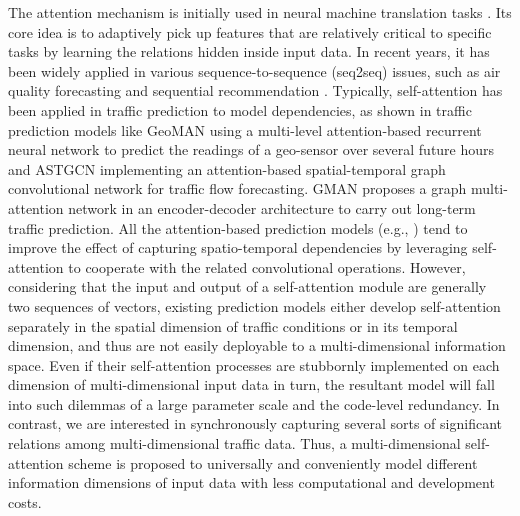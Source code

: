 The attention mechanism is initially used in neural machine translation tasks \cite{bahdanau2014neural}. Its core idea is to adaptively pick up features that are relatively critical to specific tasks by learning the relations hidden inside input data. In recent years, it has been widely applied in various sequence-to-sequence (seq2seq) issues, such as air quality forecasting \cite{cheng2018neural} and sequential recommendation \cite{2018CoupledCF}. Typically, self-attention \cite{vaswani2017attention, velivckovic2017graph}  has been applied in traffic prediction to  model dependencies, as shown in traffic prediction models like GeoMAN \cite{liang2018geoman} using a multi-level attention-based recurrent neural network to predict the readings of a geo-sensor over several future hours and ASTGCN \cite{guo2019attention} implementing an attention-based spatial-temporal graph convolutional network for traffic flow forecasting. GMAN \cite{zheng2020gman} proposes a graph multi-attention network in an encoder-decoder architecture to carry out long-term traffic prediction. All the attention-based prediction models (e.g., \cite{liang2018geoman, guo2019attention, zheng2020gman, cai2020traffic, fang2020constgat, park2020st, chen2020multi}) tend to improve the effect of capturing spatio-temporal dependencies by leveraging self-attention to cooperate with the related convolutional operations. However, considering that the input and output of a self-attention module are generally two sequences of vectors, existing prediction models either develop self-attention separately in the spatial dimension of traffic conditions or in its temporal dimension, and thus are not easily deployable  to a multi-dimensional information space. Even if their self-attention processes are stubbornly implemented on each dimension of multi-dimensional input data in turn, the resultant model will fall into such dilemmas of a large parameter scale and the code-level redundancy. In contrast, we are interested in synchronously capturing several sorts of significant relations among multi-dimensional traffic data. Thus, a multi-dimensional self-attention scheme is proposed to universally and conveniently model different information dimensions of input data with less computational and development costs.

